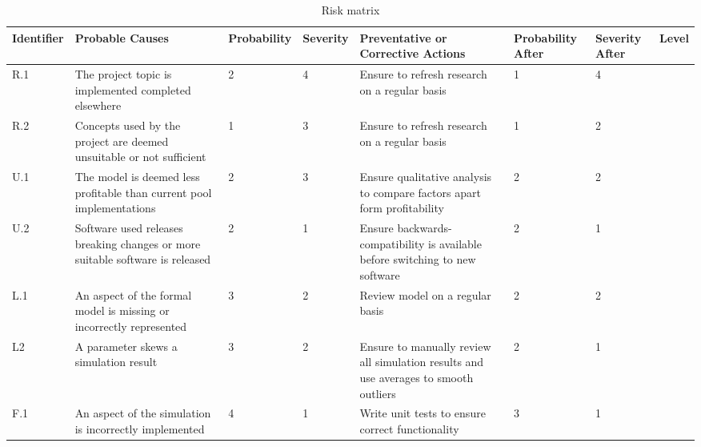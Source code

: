 \begin{landscape}
  \begin{table}[H]
    \centering
    \caption{Risk matrix}
    \begin{tabular}{|l|p{5cm}|l|l|p{5cm}|l|l|l|} \hline
      \bf Identifier         & \bf Probable Causes                                                           & \bf Probability & \bf Severity & \bf Preventative or Corrective Actions                                               & \bf Probability After & \bf Severity After & \bf Level          \\ \hline
      \cellcolor{red} R.1    & The project topic is implemented completed elsewhere                          & 2               & 4            & Ensure to refresh research on a regular basis                                        & 1                     & 4                  & \cellcolor{orange} \\ \hline
      \cellcolor{yellow} R.2 & Concepts used by the project are deemed unsuitable or not sufficient          & 1               & 3            & Ensure to refresh research on a regular basis                                        & 1                     & 2                  & \cellcolor{green} \\ \hline
      \cellcolor{orange} U.1 & The model is deemed less profitable than current pool implementations         & 2               & 3            & Ensure qualitative analysis to compare factors apart form profitability              & 2                     & 2                  & \cellcolor{yellow} \\ \hline
      \cellcolor{green} U.2  & Software used releases breaking changes or more suitable software is released & 2               & 1            & Ensure backwards-compatibility is available before switching to new software         & 2                     & 1                  & \cellcolor{green} \\ \hline
      \cellcolor{yellow} L.1 & An aspect of the formal model is missing or incorrectly represented           & 3               & 2            & Review model on a regular basis                                                      & 2                     & 2                  & \cellcolor{yellow}  \\ \hline
      \cellcolor{yellow} L2  & A parameter skews a simulation result                                         & 3               & 2            & Ensure to manually review all simulation results and use averages to smooth outliers & 2                     & 1                  & \cellcolor{green}  \\ \hline
      \cellcolor{yellow} F.1 & An aspect of the simulation is incorrectly implemented                        & 4               & 1            & Write unit tests to ensure correct functionality                                     & 3                     & 1                  & \cellcolor{green}  \\ \hline
    \end{tabular}
  \end{table}
\end{landscape}

